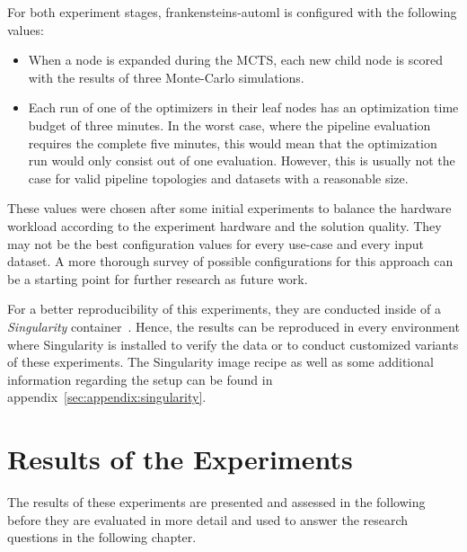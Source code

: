 For both experiment stages, frankensteins-automl is configured with the following values:
\begin{itemize}
    \item When a node is expanded during the MCTS, each new child node is scored with the results of three Monte-Carlo simulations.
    \item Each run of one of the optimizers in their leaf nodes has an optimization time budget of three minutes. In the worst case, where the pipeline evaluation requires the complete five minutes, this would mean that the optimization run would only consist out of one evaluation. However, this is usually not the case for valid pipeline topologies and datasets with a reasonable size.
\end{itemize}
These values were chosen after some initial experiments to balance the hardware workload according to the experiment hardware and the solution quality.
They may not be the best configuration values for every use-case and every input dataset.
A more thorough survey of possible configurations for this approach can be a starting point for further research as future work.

For a better reproducibility of this experiments, they are conducted inside of a \textit{Singularity} container~\cite{Kurtzer-Singularity}.
Hence, the results can be reproduced in every environment where Singularity is installed to verify the data or to conduct customized variants of these experiments.
The Singularity image recipe as well as some additional information regarding the setup can be found in appendix~\ref{sec:appendix:singularity}.

\section{Results of the Experiments}
\label{sec:evaluation:results}
The results of these experiments are presented and assessed in the following before they are evaluated in more detail and used to answer the research questions in the following chapter.

